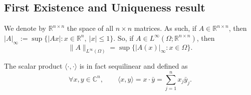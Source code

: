 \documentclass[a4paper,9pt]{amsart}
\newcommand{\frk}[1]{\mathfrak{#1}}
\newcommand{\N}{\mathbb{N}}	%
\newcommand{\R}{\mathbb{R}}	%
\newcommand{\C}{\mathbb{C}}	%
\newcommand{\real}{\frk{Re}}
\theoremstyle{plain}
\theoremstyle{definition}
\theoremstyle{remark}
\begin{document}
%
%	
%	
%	


\subsection{First Existence and Uniqueness result}\label{subs682095cb}

We denote by $\R^{n\times n}$ the space of all $n\times n$ matrices.
As such, if $A\in\R^{n\times n}$, then $|A|_\infty := \sup\{|Ax|:x\in\R^n,\ |x|\le 1\}$.
So, if $A\in L^\infty(\Omega;\R^{n\times n})$, then 
\begin{equation}
	\|A\|_{L^\infty(\Omega)} = \sup\{|A(x)|_\infty: x\in\Omega\} .
\end{equation}

The scalar product $\langle \cdot,\cdot \rangle$ is in fact sequilinear and defined as
\begin{equation}
	\forall x,y\in \C^n,\qquad
	\langle x,y \rangle = x\cdot\bar y = \sum_{j=1}^n x_j\bar y_j .
\end{equation}
\end{document}
